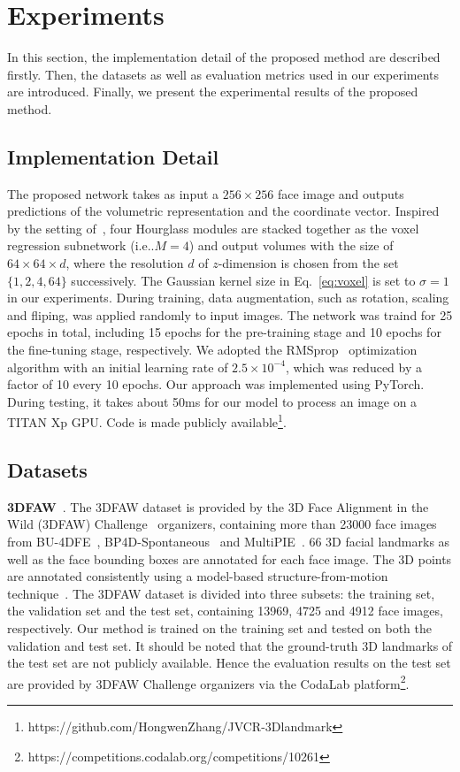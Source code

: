 \documentclass[a4paper,conference]{IEEEtran}
\makeatletter
\DeclareRobustCommand\onedot{\futurelet\@let@token\@onedot}
\def\@onedot{\ifx\@let@token.\else.\null\fi\xspace}
\def\ie{{i.e}\onedot} \def\Ie{{I.e}\onedot}
\makeatother
\begin{document}
\section{Experiments}
\label{Experiments}

In this section, the implementation detail of the proposed method are described firstly.
Then, the datasets as well as evaluation metrics used in our experiments are introduced.
Finally, we present the experimental results of the proposed method.


\subsection{Implementation Detail}
The proposed network takes as input a $256\times 256$ face image and outputs predictions of the volumetric representation and the coordinate vector.
Inspired by the setting of~\cite{newell2016stacked}, four Hourglass modules are stacked together as the voxel regression subnetwork (\ie $M=4$) and output volumes with the size of $64\times 64\times d$, where the resolution $d$ of $z$-dimension is chosen from the set $\{1,2,4,64\}$ successively. 
The Gaussian kernel size in Eq.~\ref{eq:voxel} is set to $\sigma =1$ in our experiments.
During training, data augmentation, such as rotation, scaling and fliping, was applied randomly to input images.
The network was traind for 25 epochs in total, including 15 epochs for the pre-training stage and 10 epochs for the fine-tuning stage, respectively.
We adopted the RMSprop~\cite{tieleman2012lecture} optimization algorithm with an initial learning rate of $2.5\times 10^{-4}$, which was reduced by a factor of 10 every 10 epochs.
Our approach was implemented using PyTorch. During testing, it takes about 50ms for our model to process an image on a TITAN Xp GPU.
Code is made publicly available\footnote{https://github.com/HongwenZhang/JVCR-3Dlandmark}.


\subsection{Datasets}


\textbf{3DFAW}~\cite{jeni2016first}. The 3DFAW dataset is provided by the 3D Face Alignment in the Wild (3DFAW) Challenge~\cite{jeni2016first} organizers, containing more than 23000 face images from BU-4DFE~\cite{yin2008high}, BP4D-Spontaneous~\cite{zhang2014bp4d} and MultiPIE~\cite{gross2010multi}. 
66 3D facial landmarks as well as the face bounding boxes are annotated for each face image.
The 3D points are annotated consistently using a model-based structure-from-motion technique~\cite{jeni2017dense}.
The 3DFAW dataset is divided into three subsets: the training set, the validation set and the test set, containing 13969, 4725 and 4912 face images, respectively.
Our method is trained on the training set and tested on both the validation and test set. 
It should be noted that the ground-truth 3D landmarks of the test set are not publicly available.
Hence the evaluation results on the test set are provided by 3DFAW Challenge organizers via the CodaLab platform\footnote{https://competitions.codalab.org/competitions/10261}.
\end{document}
